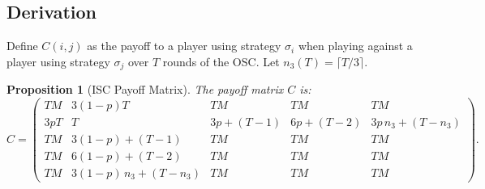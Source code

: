 \documentclass[12pt,a4paper]{article}
\newtheorem{proposition}{Proposition}[section]
\begin{document}
\subsection{Derivation}

Define $C(i,j)$ as the payoff to a player using strategy $\sigma_i$ when
playing against a player using strategy $\sigma_j$ over $T$ rounds of the OSC.
Let $n_3(T) = \lceil T/3 \rceil$.

\begin{proposition}[ISC Payoff Matrix]\label{prop:Cmatrix}
The payoff matrix $C$ is:
\begin{equation}\label{eq:C}
C = \begin{pmatrix}
T M & 3(1-p)T & TM & TM & TM \\[4pt]
3pT & T & 3p + (T-1) & 6p + (T-2) & 3p\,n_3 + (T-n_3) \\[4pt]
TM & 3(1-p)+(T-1) & TM & TM & TM \\[4pt]
TM & 6(1-p)+(T-2) & TM & TM & TM \\[4pt]
TM & 3(1-p)\,n_3+(T-n_3) & TM & TM & TM
\end{pmatrix}.
\end{equation}
\end{proposition}
\end{document}
